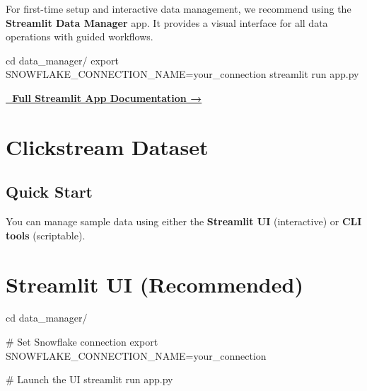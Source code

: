 \documentclass[
  letterpaper,
  DIV=11,
  numbers=noendperiod]{scrreprt}
\newenvironment{Shaded}{\begin{snugshade}}{\end{snugshade}}
\newcommand{\BuiltInTok}[1]{\textcolor[rgb]{0.00,0.23,0.31}{#1}}
\newcommand{\CommentTok}[1]{\textcolor[rgb]{0.37,0.37,0.37}{#1}}
\newcommand{\ExtensionTok}[1]{\textcolor[rgb]{0.00,0.23,0.31}{#1}}
\newcommand{\NormalTok}[1]{\textcolor[rgb]{0.00,0.23,0.31}{#1}}
\newcommand{\OperatorTok}[1]{\textcolor[rgb]{0.37,0.37,0.37}{#1}}
\newcommand{\VariableTok}[1]{\textcolor[rgb]{0.07,0.07,0.07}{#1}}
\begin{document}
\begin{tcolorbox}[enhanced jigsaw, title=\textcolor{quarto-callout-tip-color}{\faLightbulb}\hspace{0.5em}{Recommended: Streamlit Data Manager}, colbacktitle=quarto-callout-tip-color!10!white, rightrule=.15mm, arc=.35mm, colframe=quarto-callout-tip-color-frame, left=2mm, bottomtitle=1mm, toptitle=1mm, breakable, bottomrule=.15mm, opacityback=0, titlerule=0mm, toprule=.15mm, opacitybacktitle=0.6, colback=white, coltitle=black, leftrule=.75mm]

For first-time setup and interactive data management, we recommend using
the \textbf{Streamlit Data Manager} app. It provides a visual interface
for all data operations with guided workflows.

\begin{Shaded}
\begin{Highlighting}[]
\BuiltInTok{cd}\NormalTok{ data\_manager/}
\BuiltInTok{export} \VariableTok{SNOWFLAKE\_CONNECTION\_NAME}\OperatorTok{=}\NormalTok{your\_connection}
\ExtensionTok{streamlit}\NormalTok{ run app.py}
\end{Highlighting}
\end{Shaded}

\textbf{\protect\hyperlink{streamlit-data-manager}{📖 Full Streamlit App
Documentation →}}

\end{tcolorbox}

\hypertarget{clickstream-dataset}{%
\section{Clickstream Dataset}\label{clickstream-dataset}}

\hypertarget{quick-start-1}{%
\subsection{Quick Start}\label{quick-start-1}}

You can manage sample data using either the \textbf{Streamlit UI}
(interactive) or \textbf{CLI tools} (scriptable).

\section{Streamlit UI (Recommended)}

\begin{Shaded}
\begin{Highlighting}[]
\BuiltInTok{cd}\NormalTok{ data\_manager/}

\CommentTok{\# Set Snowflake connection}
\BuiltInTok{export} \VariableTok{SNOWFLAKE\_CONNECTION\_NAME}\OperatorTok{=}\NormalTok{your\_connection}

\CommentTok{\# Launch the UI}
\ExtensionTok{streamlit}\NormalTok{ run app.py}
\end{Highlighting}
\end{Shaded}
\end{document}
